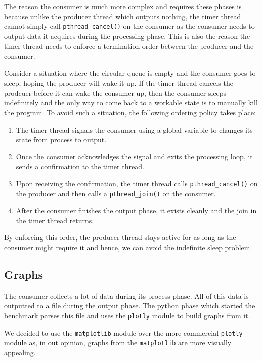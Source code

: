 \documentclass[10pt, author, twocolumn]{article}
\begin{document}
The reason the consumer is much more complex and requires these phases is because unlike the producer thread which outputs nothing, the timer thread cannot simply call \texttt{pthread\_cancel()} on the consumer as the consumer needs to output data it acquires during the processing phase. This is also the reason the timer thread needs to enforce a termination order between the producer and the consumer. 

Consider a situation where the circular queue is empty and the consumer goes to sleep, hoping the producer will wake it up. If the timer thread cancels the prodcuer before it can wake the consumer up, then the consumer sleeps indefinitely and the only way to come back to a workable state is to manually kill the program. To avoid such a situation, the following ordering policy takes place:

\begin{enumerate}
    \item The timer thread signals the consumer using a global variable to changes its state from process to output. 
    \item Once the consumer acknowledges the signal and exits the processing loop, it sends a confirmation to the timer thread. 
    \item Upon receiving the confirmation, the timer thread calls \texttt{pthread\_cancel()} on the producer and then calls a \texttt{pthread\_join()} on the consumer.
    \item After the consumer finishes the output phase, it exists cleanly and the join in the timer thread returns. 
\end{enumerate}

By enforcing this order, the producer thread stays active for as long as the consumer might require it and hence, we can avoid the indefinite sleep problem. 

\subsection{Graphs}
The consumer collects a lot of data during its process phase. All of this data is outputted to a file during the output phase. The python phase which started the benchmark parses this file and uses the \texttt{plotly} module to build graphs from it.

We decided to use the \texttt{matplotlib} module over the more commercial \texttt{plotly} module as, in out opinion, graphs from the \texttt{matplotlib} are more visually appealing.
\end{document}

